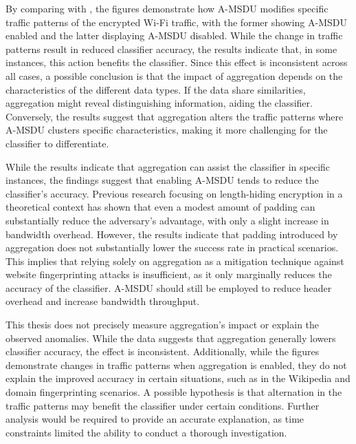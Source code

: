 By comparing  with , the figures demonstrate how A-MSDU modifies specific traffic patterns of the encrypted Wi-Fi traffic, with the former showing A-MSDU enabled and the latter displaying A-MSDU disabled. While the change in traffic patterns result in reduced classifier accuracy, the results indicate that, in some instances, this action benefits the classifier. Since this effect is inconsistent across all cases, a possible conclusion is that the impact of aggregation depends on the characteristics of the different data types. If the data share similarities, aggregation might reveal distinguishing information, aiding the classifier. Conversely, the results suggest that aggregation alters the traffic patterns where A-MSDU clusters specific characteristics, making it more challenging for the classifier to differentiate.

While the results indicate that aggregation can assist the classifier in specific instances, the findings suggest that enabling A-MSDU tends to reduce the classifier's accuracy. Previous research \cite{DBLP:conf/ctrsa/GellertJLN22} focusing on length-hiding encryption in a theoretical context has shown that even a modest amount of padding can substantially reduce the adversary's advantage, with only a slight increase in bandwidth overhead. However, the results indicate that padding introduced by aggregation does not substantially lower the success rate in practical scenarios. This implies that relying solely on aggregation as a mitigation technique against website fingerprinting attacks is insufficient, as it only marginally reduces the accuracy of the classifier. A-MSDU should still be employed to reduce header overhead and increase bandwidth throughput. 

This thesis does not precisely measure aggregation's impact or explain the observed anomalies. While the data suggests that aggregation generally lowers classifier accuracy, the effect is inconsistent. Additionally, while the figures demonstrate changes in traffic patterns when aggregation is enabled, they do not explain the improved accuracy in certain situations, such as in the Wikipedia and domain fingerprinting scenarios. A possible hypothesis is that alternation in the traffic patterns may benefit the classifier under certain conditions. Further analysis would be required to provide an accurate explanation, as time constraints limited the ability to conduct a thorough investigation.

